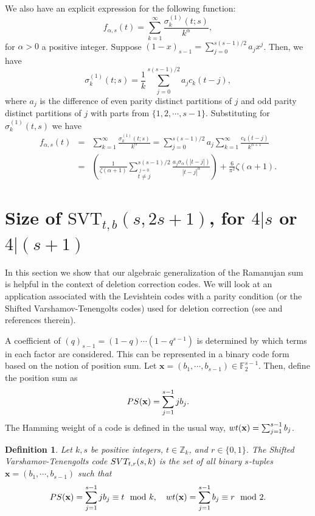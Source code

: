 \documentclass[12pt]{article}
\newtheorem{defn}{Definition}[subsection]%
\begin{document}
We also have an explicit expression for the following function: 
$$
f_{\alpha,s}(t)=\sum_{k=1}^{\infty}\frac{\sigma^{(1)}_{k}(t;s)}{k^{\alpha}}, 
$$
for $\alpha>0$ a positive integer. Suppose $(1-x)_{s-1}=\sum_{j=0}^{s(s-1)/2}a_{j}x^{j}$. Then, we have 
$$
\sigma^{(1)}_{k}(t;s)=\frac{1}{k}\sum^{s(s-1)/2}_{j=0}a_{j}c_{k}(t-j),
$$
where $a_{j}$ is the difference of even parity distinct partitions of $j$ and odd parity distinct partitions of $j$ with parts from $\{1,2,\cdots,s-1\}.$  Substituting for $\sigma_{k}^{(1)}(t,s)$ we have 
\begin{eqnarray}
 \nonumber    f_{\alpha,s}(t)&=&\sum_{k=1}^{\infty}\frac{\sigma^{(1)}_{k}(t;s)}{k^{\alpha}}=\sum_{j=0}^{s(s-1)/2}a_{j}\sum_{k=1}^{\infty}\frac{c_{k}(t-j)}{k^{\alpha+1}} \\
 \nonumber &=& \left(\frac{1}{\zeta(\alpha+1)}\sum_{\stackrel{j=0}{t\neq j}}^{s(s-1)/2}\frac{a_{j}\sigma_{\alpha}(|t-j|)}{|t-j|^{\alpha}}\right) + \frac{6}{\pi^{2}}\zeta(\alpha +1).
\end{eqnarray}


\section{Size of $\text{SVT}_{t,b}(s,2s+1)$, for $4|s$ or $4|(s+1)$}\label{sec_SVT}


In this section we show that our algebraic generalization of the Ramanujan sum is helpful in the context of deletion correction codes. We will look at an application associated with the Levishtein codes with a parity condition (or the Shifted Varshamov-Tenengolts codes) used for deletion correction (see \cite{bibak, bibak1} and references therein).   

A coefficient of $(q)_{s-1}=(1-q)\cdots(1-q^{s-1})$ is determined by which terms in each factor are considered. This can be represented in a binary code form based on the notion of position sum. Let $\mathbf{x}=(b_{1},\cdots,b_{s-1})\in \mathbb{F}^{s-1}_{2}$. Then, define the position sum as 
$$
\textnormal{PS}(\mathbf{x})=\sum_{j=1}^{s-1}jb_{j}.
$$
The Hamming weight of a code is defined in the usual way, $\textnormal{wt}(\mathbf{x})=\sum^{s-1}_{j=1}b_{j}$. 

\begin{defn}\label{SVT}
Let $k,s$ be positive integers, $t\in \mathbb{Z}_{k}$, and $r\in \{0,1\}$. The Shifted Varshamov-Tenengolts code $\textnormal{SVT}_{t,r}(s,k)$ is the set of all binary $s$-tuples $\mathbf{x}=(b_{1},\cdots,b_{s-1})$ such that 
$$
\textnormal{PS}(\mathbf{x})=\sum_{j=1}^{s-1}jb_{j}\equiv t\mod k,\quad \textnormal{wt}(\mathbf{x})=\sum_{j=1}^{s-1}b_{j} \equiv r \mod 2.
$$ 
\end{defn}
\end{document}
